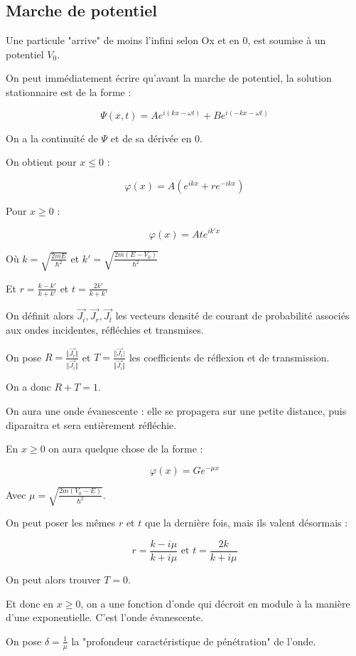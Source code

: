 \documentclass[a4paper,12pt]{book}
\newcommand{\Def}[2]{\begin{tcolorbox}[colback=white,colframe=red!10!green!20!blue!75!, title=Définition : #1]#2\end{tcolorbox}}
\newcommand{\Thr}[2]{\begin{tcolorbox}[sharp corners, colback=white,colframe=red!10!blue!30!green!75!, title=Théorème : #1]#2\end{tcolorbox}}
\renewcommand{\Vec}[1]{\overrightarrow{#1}}
\begin{document}
\subsection{Marche de potentiel}
\Def{Présentation du problème}{Une particule "arrive" de moins l'infini selon Ox et en $0$, est soumise à un potentiel $V_0$.
\par On peut immédiatement écrire qu'avant la marche de potentiel, la solution stationnaire est de la forme :
\par $$\Psi(x,t) = Ae^{i(kx-\omega t)}+Be^{i(-kx-\omega t)}$$
\par On a la continuité de $\Psi$ et de sa dérivée en $0$.}
\Thr{Solution si l'énergie surpasse le potentiel}{On obtient pour $x\leq 0$ :
\par $$\varphi(x) =A(e^{ikx}+re^{-ikx})$$
\par Pour $x\geq 0$ :
\par $$\varphi(x) = Ate^{ik'x}$$
\par Où $k = \sqrt{\frac{2mE}{\hbar^2}}$ et $k' =\sqrt{\frac{2m(E-V_0)}{\hbar^2}}$
\par Et $r = \frac{k-k'}{k+k'}$ et $t=\frac{2k'}{k+k'}$
\par On définit alors $\Vec{J_i},\Vec{J_r}, \Vec{J_t}$ les vecteurs densité de courant de probabilité associés aux ondes incidentes, réfléchies et transmises.
\par On pose $R = \frac{\Vert\Vec{J_r}\Vert}{\Vert\Vec{J_i}\Vert}$ et $T=\frac{\Vert\Vec{J_t}\vert}{\Vert\Vec{J_i}\Vert}$ les coefficients de réflexion et de transmission.
\par On a donc $R+T=1$.}
\Thr{Solution avec énergie moins forte que le potentiel}{On aura une onde évanescente : elle se propagera sur une petite distance, puis diparaitra et sera entièrement réfléchie.
\par En $x\geq 0$ on aura quelque chose de la forme :
\par $$\varphi(x)=Ge^{-\mu x}$$
\par Avec $\mu=\sqrt{\frac{2m(V_0-E)}{\hbar^2}}$.
\par On peut poser les mêmes $r$ et $t$ que la dernière fois, mais ils valent désormais :
\par $$r=\frac{k-i\mu}{k+i\mu}\text{ et }t=\frac{2k}{k+i\mu}$$
\par On peut alors trouver $T=0$.
\par Et donc en $x\geq 0$, on a une fonction d'onde qui décroit en module à la manière d'une exponentielle. C'est l'onde évanescente.
\par On pose $\delta = \frac{1}{\mu}$ la "profondeur caractéristique de pénétration" de l'onde.}
\end{document}
